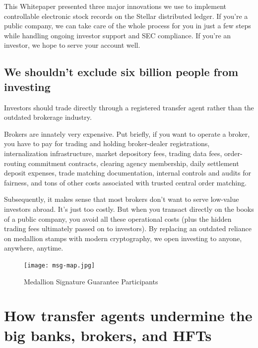 \documentclass[11pt, english]{article}
\begin{document}
\begin{multicols}{2}
This Whitepaper presented three major innovations we use to implement controllable electronic stock records on the Stellar distributed ledger. If you're a public company, we can take care of the whole process for you in just a few steps while handling ongoing investor support and SEC compliance. If you're an investor, we hope to serve your account well.


\subsection{We shouldn't exclude six billion people from investing}

Investors should trade directly through a registered transfer agent rather than the outdated brokerage industry. 

Brokers are innately very expensive. Put briefly, if you want to operate a broker, you have to pay for trading and holding broker-dealer registrations, internalization infrastructure, market depository fees, trading data fees, order-routing commitment contracts, clearing agency membership, daily settlement deposit expenses, trade matching documentation, internal controls and audits for fairness, and tons of other costs associated with trusted central order matching.

Subsequently, it makes sense that most brokers don't want to serve low-value investors abroad. It's just too costly. But when you transact directly on the books of a public company, you avoid all these operational costs (plus the hidden trading fees ultimately passed on to investors). By replacing an outdated reliance on medallion stamps with modern cryptography, we open investing to anyone, anywhere, anytime.

\end{multicols}

\begin{figure}[H]
    \centering
    \texttt{[image: msg-map.jpg]}
    \caption{Medallion Signature Guarantee Participants \cite{MSG_2022}}
\end{figure}

\pagebreak
\begin{multicols}{2}

\footnotesize{
    
    
}

\end{multicols}

\appendix



\section{How transfer agents undermine the big banks, brokers, and HFTs}\label{appendix-intro}
\end{document}
